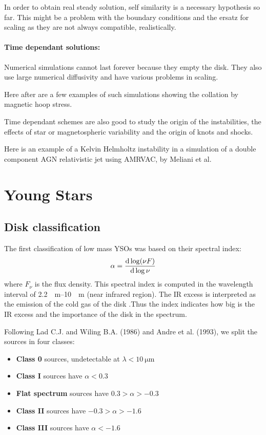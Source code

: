\documentclass[10pt,a4paper,english,draft]{article}
\begin{document}
In order to obtain real steady solution, self similarity is a necessary hypothesis so far. This might be a problem with the boundary conditions and the ersatz for scaling as they are not always compatible, realistically.

\paragraph{Time dependant solutions:}

Numerical simulations cannot last forever because they empty the disk. They also use large numerical diffusivity and have various problems in scaling.

Here after are a few examples of such simulations showing the collation by magnetic hoop stress.

Time dependant schemes are also good to study the origin of the instabilities, the effects of star or magnetospheric variability and the origin of knots and shocks.


Here is an example of a Kelvin Helmholtz instability in a simulation of a double component AGN relativistic jet using AMRVAC, by Meliani et al.


\section{Young Stars}

\subsection{Disk classification}
The first classification of low mass YSOs was based on their spectral index:
\begin{equation}
  \alpha = \frac{\mathrm{d} \log (\nu F)}{\mathrm{d} \log \nu}
\end{equation}
where $F_\nu$ is the flux density.
This spectral index is computed in the wavelength interval of \SIrange{2.2}{10}{\mu\m} (near infrared region). The IR excess is interpreted as the emission of the cold gas of the disk .Thus the index indicates how big is the IR excess and the importance of the disk in the spectrum.


Following Lad C.J. and Wiling B.A. (1986) and Andre et al. (1993), we split the sources in four classes:
\begin{itemize}
\item \textbf{Class 0} sources, undetectable at $\lambda < \SI{10}{\micro\m}$
\item \textbf{Class I} sources have $\alpha < 0.3$
\item \textbf{Flat spectrum} sources have $0.3 > \alpha > -0.3$
\item \textbf{Class II} sources have $-0.3 > \alpha > -1.6$
\item \textbf{Class III} sources have $\alpha < -1.6$
\end{itemize}
\end{document}
